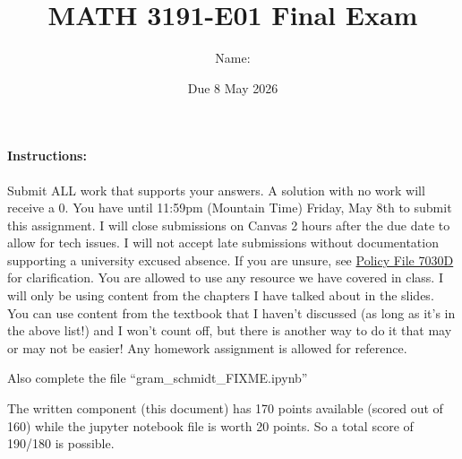 \documentclass[12pt,addpoints]{exam}
\title{MATH 3191-E01 Final Exam}
\date{Due 8 May 2026}
\author{Name: \rule{150pt}{1pt}}
\begin{document}
   \maketitle

    \paragraph{Instructions:} Submit ALL work that supports your answers. A solution with no work will
    receive a $0$. You have until 11:59pm (Mountain Time) Friday, May 8th to submit this assignment.
    I will close submissions on Canvas 2 hours after the due date to allow for tech issues. I will not
    accept late submissions without documentation supporting a university excused absence. If you are
    unsure, see \href{https://www.ucdenver.edu/docs/librariesprovider284/default-document-library/7030d---student-attendance-and-absences---cu-denver02fbb186-4b01-4e15-af21-2ab4bbaac065.pdf?sfvrsn=f1001eb4_1}
    {Policy File 7030D} for clarification. You are allowed to use any resource we have covered in
    class.
    I will only be using content from the chapters I have talked about in the slides. You can use content from the
    textbook that I haven't discussed (as long as it's in the above list!) and I won't count off,
    but there is another way to do it that may or may not be easier! Any homework assignment
    is allowed for reference.

    Also complete the file ``gram\_schmidt\_FIXME.ipynb''

    The written component (this document) has 170 points available (scored out of 160) while the
    jupyter notebook file is worth 20 points. So a total score of 190/180 is possible.
\end{document}
